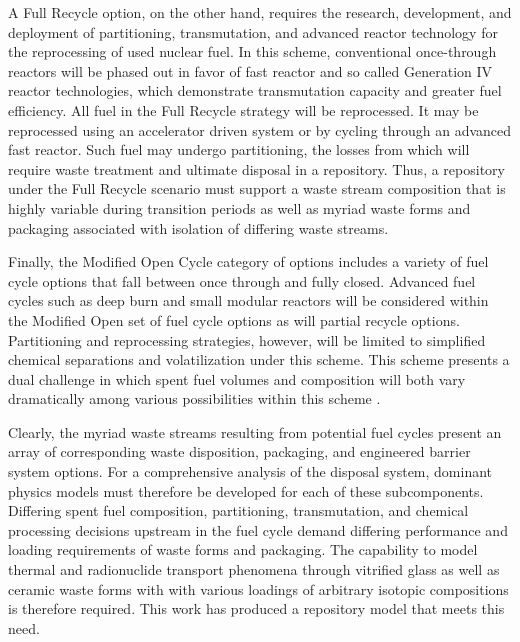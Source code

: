 
A Full Recycle option, on the other hand, requires the research, development, 
and deployment of partitioning, transmutation, and advanced reactor technology 
for the reprocessing of used nuclear fuel.  In this scheme, conventional 
once-through reactors will be phased out in favor of fast reactor and so called 
Generation IV reactor technologies, which demonstrate transmutation capacity and 
greater fuel efficiency. All fuel in the Full Recycle strategy will be 
reprocessed. It may be reprocessed using  an accelerator driven system or by 
cycling through an advanced fast reactor. Such fuel may undergo partitioning, 
the losses from which will require waste treatment and ultimate disposal in a 
repository. Thus, a repository under the Full Recycle scenario must support
a waste stream composition that is highly variable during transition periods as 
well as myriad waste forms and packaging associated with isolation of differing 
waste streams.


Finally, the Modified Open Cycle category of options includes a variety of fuel 
cycle options that fall between once through and fully closed. Advanced fuel 
cycles such as deep burn and small modular reactors will be considered within 
the Modified Open set of fuel cycle options as will partial recycle options.  
Partitioning and reprocessing strategies, however, will be limited to simplified 
chemical separations and volatilization under this scheme. This scheme presents
a dual challenge in which spent fuel volumes and composition will both vary 
dramatically among various possibilities within this scheme 
\cite{doe_nuclear_2010} .


Clearly, the myriad waste streams resulting from potential fuel cycles present 
an array of corresponding waste disposition, packaging, and engineered barrier 
system options. For a comprehensive analysis of the disposal system, dominant 
physics models must therefore be developed for each of these subcomponents.  Differing 
spent fuel composition, partitioning, transmutation, and chemical processing 
decisions upstream in the fuel cycle demand differing performance and loading 
requirements of waste forms and packaging. The capability to model thermal and 
radionuclide transport phenomena through vitrified glass as well 
as ceramic waste forms with with various loadings of arbitrary isotopic 
compositions is therefore required. This work has produced a repository model 
that meets this need. 

